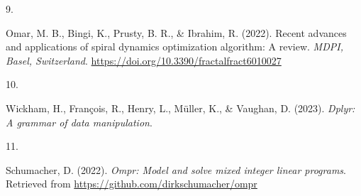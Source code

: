 \documentclass[
]{article}
\newlength{\cslhangindent}
\newlength{\csllabelwidth}
\newlength{\cslentryspacingunit} %
\newenvironment{CSLReferences}[2] %
 {%
  \setlength{\parindent}{0pt}
  \ifodd #1
  \let\oldpar\par
  \def\par{\hangindent=\cslhangindent\oldpar}
  \fi
  \setlength{\parskip}{#2\cslentryspacingunit}
 }%
 {}
\newcommand{\CSLLeftMargin}[1]{\parbox[t]{\csllabelwidth}{#1}}
\newcommand{\CSLRightInline}[1]{\parbox[t]{\linewidth - \csllabelwidth}{#1}\break}
\begin{document}
\begin{CSLReferences}{0}{0}
\leavevmode{}%
\CSLLeftMargin{9. }%
\CSLRightInline{Omar, M. B., Bingi, K., Prusty, B. R., \& Ibrahim, R.
(2022). Recent advances and applications of spiral dynamics optimization
algorithm: A review. \emph{MDPI, Basel, Switzerland}.
\url{https://doi.org/10.3390/fractalfract6010027}}

\leavevmode{}%
\CSLLeftMargin{10. }%
\CSLRightInline{Wickham, H., François, R., Henry, L., Müller, K., \&
Vaughan, D. (2023). \emph{Dplyr: A grammar of data manipulation}.}

\leavevmode{}%
\CSLLeftMargin{11. }%
\CSLRightInline{Schumacher, D. (2022). \emph{Ompr: Model and solve mixed
integer linear programs}. Retrieved from
\url{https://github.com/dirkschumacher/ompr}}

\end{CSLReferences}
\end{document}
